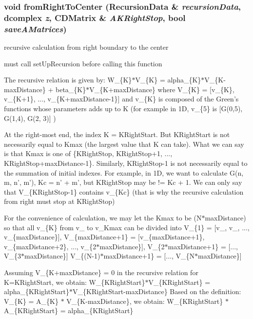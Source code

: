 \subsubsection{\setlength{\rightskip}{0pt plus 5cm}void from\-Right\-To\-Center (\bf{Recursion\-Data} \& {\em recursion\-Data}, \bf{dcomplex} {\em z}, \bf{CDMatrix} \& {\em AKRight\-Stop}, bool {\em save\-AMatrices})}\label{recursiveCalculation_8cpp_1a03ed5a49ba999850f231f2f81b32a5}


recursive calculation from right boundary to the center

must call set\-Up\-Recursion before calling this function 

The recursive relation is given by: W\_\-\{K\}$\ast$V\_\-\{K\} = alpha\_\-\{K\}$\ast$V\_\-\{K-max\-Distance\} + beta\_\-\{K\}$\ast$V\_\-\{K+max\-Distance\} where V\_\-\{K\} = [v\_\-\{K\}, v\_\-\{K+1\}, ..., v\_\-\{K+max\-Distance-1\}] and v\_\-\{K\} is composed of the Green's functions whose parameters adds up to K (for example in 1D, v\_\-\{5\} is [G(0,5), G(1,4), G(2, 3)] )

At the right-most end, the index K = KRight\-Start. But KRight\-Start is not necessarily equal to Kmax (the largest value that K can take). What we can say is that Kmax is one of \{KRight\-Stop, KRight\-Stop+1, ..., KRight\-Stop+max\-Distance-1\}. Similarly, KRight\-Stop-1 is not necessarily equal to the summation of initial indexes. For example, in 1D, we want to calculate G(n, m, n', m'), Kc = n' + m', but KRight\-Stop may be != Kc + 1. We can only say that V\_\-\{KRight\-Stop-1\} contains v\_\-\{Kc\} (that is why the recursive calculation from right must stop at KRight\-Stop)

For the convenience of calculation, we may let the Kmax to be (N$\ast$max\-Distance) so that all v\_\-\{K\} from v\_ to v\_\-Kmax can be divided into V\_\-\{1\} = [v\_, v\_, ..., v\_\-\{max\-Distance\}], V\_\-\{max\-Distance+1\} = [v\_\-\{max\-Distance+1\}, v\_\-\{max\-Distance+2\}, ..., v\_\-\{2$\ast$max\-Distance\}], V\_\-\{2$\ast$max\-Distance+1\} = [..., V\_\-\{3$\ast$max\-Distance\}] V\_\-\{(N-1)$\ast$max\-Distance+1\} = [..., V\_\-\{N$\ast$max\-Distance\}]

Assuming V\_\-\{K+max\-Distance\} = 0 in the recursive relation for K=KRight\-Start, we obtain: W\_\-\{KRight\-Start\}$\ast$V\_\-\{KRight\-Start\} = alpha\_\-\{KRight\-Start\}$\ast$V\_\-\{KRight\-Start-max\-Distance\} Based on the definition: V\_\-\{K\} = A\_\-\{K\} $\ast$ V\_\-\{K-max\-Distance\}, we obtain: W\_\-\{KRight\-Start\} $\ast$ A\_\-\{KRight\-Start\} = alpha\_\-\{KRight\-Start\}

